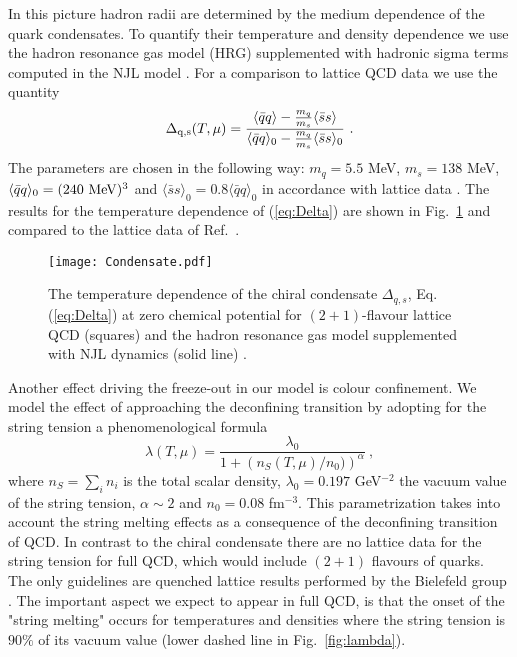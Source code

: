 \documentclass[12pt]{article}
\begin{document}
%
In this picture hadron radii are determined by the medium dependence of the quark condensates. 
To quantify their temperature and density dependence we use the hadron resonance gas model (HRG) supplemented with hadronic sigma terms computed in the NJL model \cite{Jankowski:2012ms}.
For a comparison to lattice QCD data we use the quantity \cite{Borsanyi:2010bp}
%
\begin{equation}
\Delta_{\rm q, s}(T,\mu) = \frac{\langle \bar{q}q\rangle - \frac{m_q}{m_s}\langle \bar{s}s\rangle}{\langle \bar{q}q\rangle_0 - \frac{m_q}{m_s}\langle \bar{s}s\rangle_0}~.
\label{eq:Delta}
\end{equation}
%
The parameters are chosen in the following way:
$m_q=5.5$ MeV, $m_s=138$ MeV, $\langle\bar{q}q\rangle_0=(240~{\rm MeV})^3$
and $\langle\bar{s}s\rangle_0=0.8\langle\bar{q}q\rangle_0$ in 
accordance with lattice data \cite{Borsanyi:2010bp}.
The results for the temperature dependence of (\ref{eq:Delta}) are shown in Fig.~\ref{fig:Condensate}
and compared to the lattice data of Ref.~\cite{Borsanyi:2010bp}. 


\begin{figure}[h]
	\begin{center}
	\texttt{[image: Condensate.pdf]}
	\caption{The temperature dependence of the chiral condensate $\Delta_{q,s}$, Eq. (\ref{eq:Delta})  at zero chemical potential
	for $(2+1)$-flavour  lattice QCD (squares) \cite{Borsanyi:2010bp} and
 	the hadron resonance gas model supplemented with NJL dynamics (solid line) \cite{Jankowski:2012ms}.} 
	\label{fig:Condensate}
	\end{center}
\end{figure}



Another effect driving the freeze-out in our model is colour confinement. 
We model the effect of approaching the deconfining transition by adopting for the string tension a phenomenological formula
%
\begin{equation}
\lambda(T,\mu)=\frac{\lambda_0}{1+\left(n_S(T,\mu)/n_0)\right)^\alpha}~,
\label{eq:LambdaLorentz}
\end{equation}
%
where $n_S=\sum_i n_i$ is the total scalar density, $\lambda_0=0.197$ GeV$^{-2}$ the vacuum value of the string tension, $\alpha\sim2$ and $n_0=0.08$ fm$^{-3}$.
This parametrization takes into account the string melting effects as a consequence of the deconfining transition of QCD.
In contrast to the chiral condensate there are no lattice data for the string tension for full QCD, which would include $(2+1)$ flavours of quarks. 
The only guidelines are quenched lattice results performed by the Bielefeld group \cite{Kaczmarek:1999mm,Doring:2007uh}.
The important aspect we expect to appear in full QCD, is that the onset of the "string melting" occurs 
for temperatures and densities where the string tension is $90\%$ of its vacuum value (lower dashed line 
in Fig.~\ref{fig:lambda}). 
\end{document}
